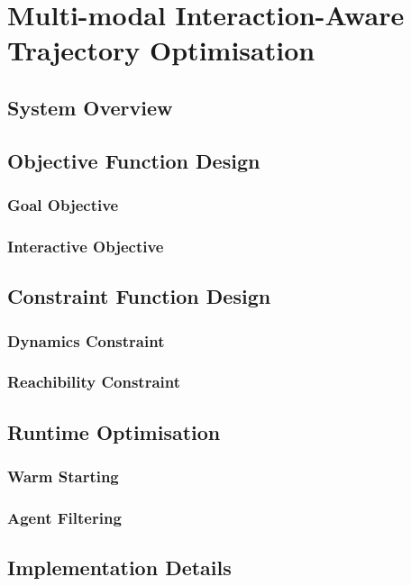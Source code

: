 \chapter{Multi-modal Interaction-Aware Trajectory Optimisation}
\label{text:approach}

\section{System Overview}
\label{text:approach/overview}

\section{Objective Function Design}
\label{text:approach/objective}

\subsection{Goal Objective}
\label{text:approach/objective/goal}

\subsection{Interactive Objective}
\label{text:approach/objective/interactive}

\section{Constraint Function Design}
\label{text:approach/constraint}

\subsection{Dynamics Constraint}
\label{text:approach/constraint/dynamics}

\subsection{Reachibility Constraint}
\label{text:approach/constraint/reachibility}

\section{Runtime Optimisation}
\label{text:approach/runtime}

\subsection{Warm Starting}
\label{text:approach/runtime/warm_starting}

\subsection{Agent Filtering}
\label{text:approach/runtime/filtering}

\section{Implementation Details}
\label{text:approach/implementation}
